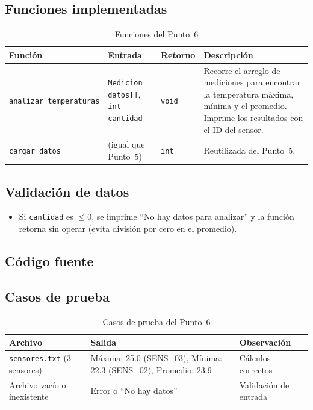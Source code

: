 \documentclass[12pt, letterpaper]{article}
\begin{document}
\subsection{Funciones implementadas}

\begin{table}[H]
\centering
\begin{tabular}{|l|p{3.5cm}|l|p{5cm}|}
\hline
\textbf{Función} & \textbf{Entrada} & \textbf{Retorno} & \textbf{Descripción} \\
\hline
\texttt{analizar\_temperaturas} &
\texttt{Medicion datos[]},
\texttt{int cantidad} &
\texttt{void} &
Recorre el arreglo de mediciones para encontrar la temperatura máxima,
mínima y el promedio. Imprime los resultados con el ID del sensor. \\
\hline
\texttt{cargar\_datos} &
(igual que Punto~5) &
\texttt{int} &
Reutilizada del Punto~5. \\
\hline
\end{tabular}
\caption{Funciones del Punto~6}
\end{table}

\subsection{Validación de datos}

\begin{itemize}
    \item Si \texttt{cantidad} es $\leq 0$, se imprime ``No hay datos para
          analizar'' y la función retorna sin operar (evita división por cero
          en el promedio).
\end{itemize}

\subsection{Código fuente}



\subsection{Casos de prueba}

\begin{table}[H]
\centering
\begin{tabular}{|p{3.5cm}|p{6cm}|p{3.5cm}|}
\hline
\textbf{Archivo} & \textbf{Salida} & \textbf{Observación} \\
\hline
\texttt{sensores.txt} (3 sensores) &
Máxima: 25.0 (SENS\_03), Mínima: 22.3 (SENS\_02), Promedio: 23.9 &
Cálculos correctos \\
\hline
Archivo vacío o inexistente &
Error o ``No hay datos'' &
Validación de entrada \\
\hline
\end{tabular}
\caption{Casos de prueba del Punto~6}
\end{table}
\end{document}
